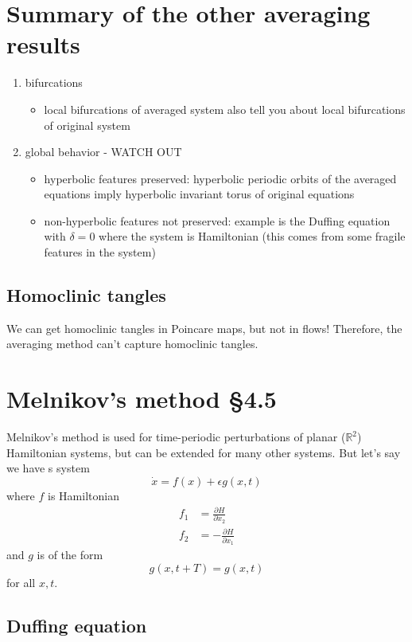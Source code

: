 \documentclass{article}
\begin{document}
\section{Summary of the other averaging results}
\begin{enumerate}
    \item[\S 4.3] bifurcations
    \begin{itemize}
        \item local bifurcations of averaged system also tell you about local bifurcations of original system
    \end{itemize}
    \item[\S 4.4] global behavior - WATCH OUT
    \begin{itemize}
        \item hyperbolic features preserved: hyperbolic periodic orbits of the averaged equations imply hyperbolic invariant torus of original equations
        \item non-hyperbolic features not preserved: example is the Duffing equation with $\delta=0$ where the system is Hamiltonian (this comes from some fragile features in the system)
    \end{itemize}
\end{enumerate}

\subsection{Homoclinic tangles}

We can get homoclinic tangles in Poincare maps, but not in flows! Therefore, the averaging method can't capture homoclinic tangles.

\section{Melnikov's method \S 4.5}

Melnikov's method is used for time-periodic perturbations of planar ($\mathbb{R}^2$) Hamiltonian systems, but can be extended for many other systems. But let's say we have s system 
\[
\dot{x} = f(x) + \epsilon g(x,t)
\]
where $f$ is Hamiltonian
\begin{align*}
    f_1 &= \frac{\partial H}{\partial x_2}\\
    f_2 &= -\frac{\partial H}{\partial x_1}
\end{align*}
and $g$ is of the form 
\[
g(x,t+T) = g(x,t)
\]
for all $x,t$. 

\subsection{Duffing equation}
\end{document}
